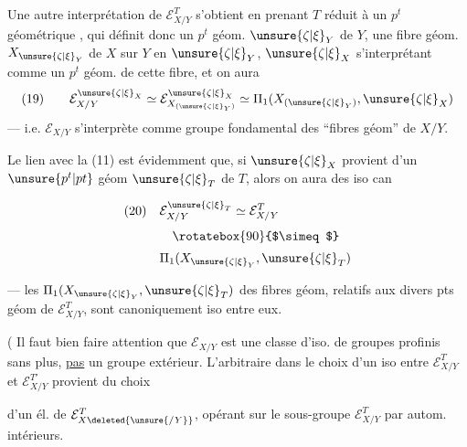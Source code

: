 
Une autre interprétation de $\mathcal E_{X/Y}^T$ s'obtient en prenant $T$ réduit à un $p^t$ géométrique , qui définit donc un $p^t$ géom. $\unsure{\zeta|\xi}_Y$ de $Y$, une fibre géom. $X_{\unsure{\zeta|\xi}_Y}$ de $X$ sur $Y$ en $\unsure{\zeta|\xi}_Y$, $\unsure{\zeta|\xi}_X$ s'interprétant comme un $p^t$ géom. de cette fibre, et on aura
\[
(19)\qquad \mathcal E_{X/Y}^{\unsure{\zeta|\xi}_X}\simeq\mathcal E_{X_{(\unsure{\zeta|\xi}_Y)}}^{\unsure{\zeta|\xi}_X}\simeq\Pi_1(X_{(\unsure{\zeta|\xi}_Y)},\unsure{\zeta|\xi}_X)
\]
--- i.e. $\mathcal E_{X/Y}$ s'interprète comme groupe fondamental des ``fibres géom'' de $X/Y$.



Le lien avec la  (11) est évidemment que, si $\unsure{\zeta|\xi}_X$ provient d'un $\unsure{p^t|pt}$ géom $\unsure{\zeta|\xi}_T$ de $T$, alors on aura des iso can

\[
\begin{aligned}
(20)\quad &\mathcal E_{X/Y}^{\unsure{\zeta|\xi}_T}\simeq\mathcal E_{X/Y}^T\\[0.5ex]
&\quad\rotatebox{90}{$\simeq$}\\[0.5ex]
&\Pi_1(X_{\unsure{\zeta|\xi}_Y},\unsure{\zeta|\xi}_T)
\end{aligned}
\]

 --- les $\Pi_1(X_{\unsure{\zeta|\xi}_Y},\unsure{\zeta|\xi}_T)$ des fibres géom, relatifs aux divers pts géom de $\mathcal E_{X/Y}^T$, sont canoniquement iso entre eux.

( Il faut bien faire attention que $\mathcal E_{X/Y}$  est une classe d'iso. de groupes profinis sans plus, \uline{pas} un groupe extérieur. L'arbitraire dans le choix d'un iso entre $\mathcal E_{X/Y}^T$ et $\mathcal E_{X/Y}^{T'}$ provient du choix



d'un él. de $\mathcal E_{X\deleted{\unsure{/Y}}}^T$, opérant
sur le sous-groupe $\mathcal E_{X/Y}^T$ par autom.
intérieurs.

